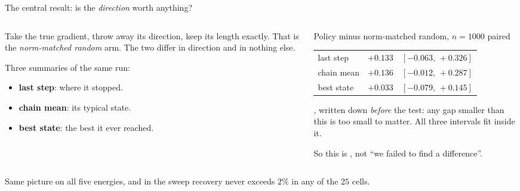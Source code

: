 \documentclass{beamer}
\begin{document}
\begin{frame}{The central result: is the \emph{direction} worth anything?}
  \begin{columns}[T]
    \begin{column}{0.5\textwidth}
      \small
       Take the true gradient, throw away its direction, keep its length
      exactly. That is the \emph{norm-matched random} arm. The two differ in direction and in
      nothing else.
      \vspace{0.5em}

       Three summaries of the same run:
      \begin{itemize}\small
        \item \textbf{last step}: where it stopped.
        \item \textbf{chain mean}: its typical state.
        \item \textbf{best state}: the best it ever reached.
      \end{itemize}
    \end{column}
    \begin{column}{0.5\textwidth}
      \begin{block}{Policy minus norm-matched random, $n=1000$ paired}
        \scriptsize
        \begin{tabular}{lrl}
          last step   & $+0.133$ & $[-0.063,\,+0.326]$ \\
          chain mean  & $+0.136$ & $[-0.012,\,+0.287]$ \\
          best state  & $+0.033$ & $[-0.079,\,+0.145]$ \\
        \end{tabular}
      \end{block}
      \vspace{-0.2em}
      {\small {}, written down \emph{before} the test: any gap
      smaller than this is too small to matter. All three intervals fit inside it.}
      \vspace{0.4em}

      {\small So this is , not ``we failed to find a
      difference''.}
    \end{column}
  \end{columns}
  \vspace{0.4em}
  \begin{center}\small
  Same picture on all five energies, and in the sweep recovery never exceeds $2\%$ in any of the $25$ cells.
  \end{center}
\end{frame}
\end{document}
